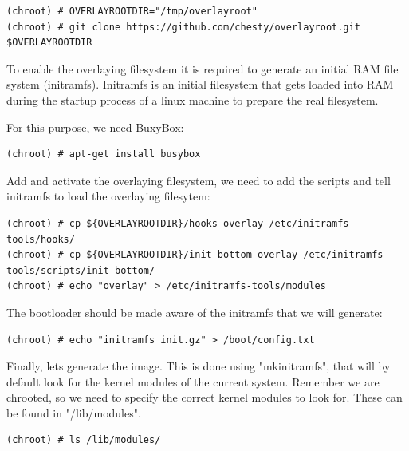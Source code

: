 \begin{lstlisting}[]
(chroot) # OVERLAYROOTDIR="/tmp/overlayroot"
(chroot) # git clone https://github.com/chesty/overlayroot.git $OVERLAYROOTDIR
\end{lstlisting}
\FloatBarrier
\vspace{-5mm}

To enable the overlaying filesystem it is required to generate an initial \ac{RAM}
file system (initramfs). Initramfs is an initial filesystem that gets loaded into
\ac{RAM} during the startup process of a linux machine to prepare the real
filesystem.

For this purpose, we need BuxyBox:

\begin{lstlisting}[]
(chroot) # apt-get install busybox
\end{lstlisting}
\FloatBarrier
\vspace{-5mm}

Add and activate the overlaying filesystem, we need to add the scripts and tell initramfs
to load the overlaying filesytem:

\begin{lstlisting}[]
(chroot) # cp ${OVERLAYROOTDIR}/hooks-overlay /etc/initramfs-tools/hooks/
(chroot) # cp ${OVERLAYROOTDIR}/init-bottom-overlay /etc/initramfs-tools/scripts/init-bottom/
(chroot) # echo "overlay" > /etc/initramfs-tools/modules
\end{lstlisting}
\FloatBarrier
\vspace{-5mm}

The bootloader should be made aware of the initramfs that we will generate:

\begin{lstlisting}[]
(chroot) # echo "initramfs init.gz" > /boot/config.txt
\end{lstlisting}
\FloatBarrier
\vspace{-5mm}

Finally, lets generate the image. This is done using "mkinitramfs", that will
by default look for the kernel modules of the current system. Remember we are
chrooted, so we need to specify the correct kernel modules to look for. These
can be found in "/lib/modules".

\begin{lstlisting}[]
(chroot) # ls /lib/modules/
\end{lstlisting}
\FloatBarrier
\vspace{-5mm}

